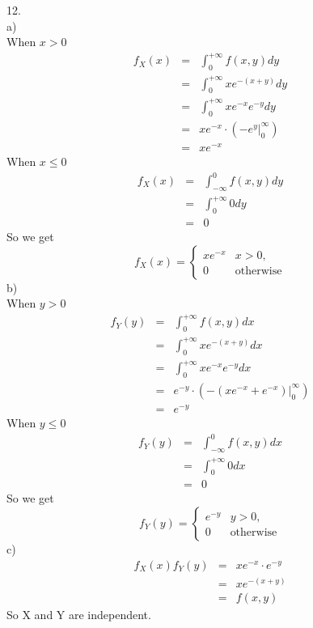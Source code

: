 \documentclass[12pt]{article}
\begin{document}
12. \\
a) \\
When $x > 0$
\begin{eqnarray*}
  f_X(x)
  &=& \int_{0}^{+\infty} f(x,y) dy \\
  &=& \int_{0}^{+\infty} xe^{-(x+y)} dy \\
  &=& \int_{0}^{+\infty} xe^{-x}e^{-y} dy \\
  &=& xe^{-x} \cdot (-e^y|_0^{\infty}) \\
  &=& xe^{-x}
\end{eqnarray*}
When $x \le 0$
\begin{eqnarray*}
  f_X(x)
  &=& \int_{-\infty}^{0} f(x,y) dy \\
  &=& \int_{0}^{+\infty} 0 dy \\
  &=& 0
\end{eqnarray*}
So we get
\begin{equation*}
  f_X(x) =
  \begin{cases}
    xe^{-x} & x > 0,\\
    0 & \text{otherwise}
  \end{cases}
\end{equation*}
b) \\
When $y > 0$
\begin{eqnarray*}
  f_Y(y)
  &=& \int_{0}^{+\infty} f(x,y) dx \\
  &=& \int_{0}^{+\infty} xe^{-(x+y)} dx \\
  &=& \int_{0}^{+\infty} xe^{-x}e^{-y} dx \\
  &=& e^{-y} \cdot (-(xe^{-x}+e^{-x})|_0^{\infty}) \\
  &=& e^{-y}
\end{eqnarray*}
When $y \le 0$
\begin{eqnarray*}
  f_Y(y)
  &=& \int_{-\infty}^{0} f(x,y) dx \\
  &=& \int_{0}^{+\infty} 0 dx \\
  &=& 0
\end{eqnarray*}
So we get
\begin{equation*}
  f_Y(y) =
  \begin{cases}
    e^{-y} & y > 0,\\
    0 & \text{otherwise}
  \end{cases}
\end{equation*}
c) \\
\begin{eqnarray*}
  f_X(x)f_Y(y)
  &=& xe^{-x} \cdot e^{-y} \\
  &=& xe^{-(x+y)} \\
  &=& f(x,y)
\end{eqnarray*}
So X and Y are independent. \\
\end{document}
